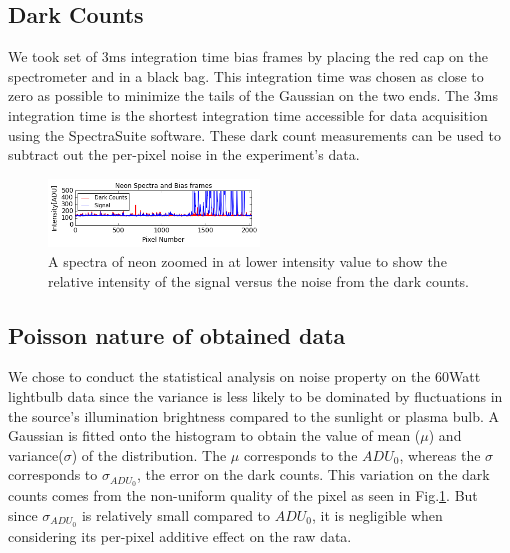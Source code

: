\documentclass[authoryear, 12pt,5p, times]{elsarticle}
\begin{document}
  \subsection{Dark Counts}
 We took set of 3ms integration time bias frames by placing the red cap on the spectrometer and in a black bag. This integration time was chosen as close to zero as possible to minimize the tails of the Gaussian on the two ends. The 3ms integration time is the shortest integration time accessible for data acquisition using the SpectraSuite software. These dark count measurements can be used to subtract out the per-pixel noise in the experiment's data.
 \begin{figure}[h!]
\includegraphics[width=0.5\textwidth]{figures/dark}
\caption{A spectra of neon zoomed in at lower intensity value to show the relative intensity of the signal versus the noise from the dark counts.} 
\label{dark_counts}
\end{figure}
 \subsection{Poisson nature of obtained data}
 We chose to conduct the statistical analysis on noise property on the 60Watt lightbulb data since the variance is less likely to be dominated by fluctuations in the source's illumination brightness compared to the sunlight or plasma bulb. 
A Gaussian is fitted onto the histogram to obtain the value of mean ($\mu$) and variance($\sigma$) of the distribution. The $\mu$ corresponds to the $ADU_0$, whereas the $\sigma$ corresponds to $\sigma_{ADU_0}$, the error on the dark counts. This variation on the dark counts comes from the non-uniform quality of the pixel as seen in Fig.\ref{dark_counts}. But since $\sigma_{ADU_0}$ is relatively small compared to $ADU_0$, it is negligible when considering its per-pixel additive effect on the raw data.
\end{document}
